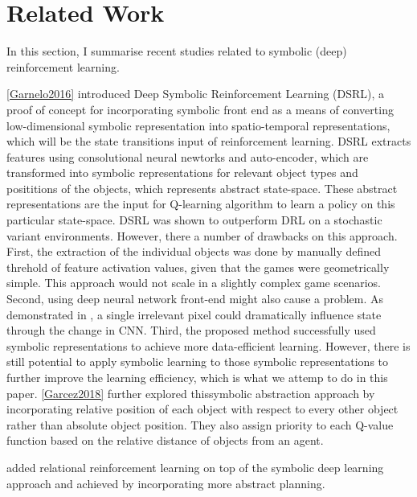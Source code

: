 \documentclass[12pt,twoside]{report}
\begin{document}
\chapter{Related Work}
\label{related_work}
In this section, I summarise recent studies related to symbolic (deep) reinforcement learning. 

 \ref{Garnelo2016} introduced Deep Symbolic Reinforcement Learning (DSRL), a proof of concept for incorporating symbolic front end as a means of converting low-dimensional symbolic representation into spatio-temporal representations, which will be the state transitions input of reinforcement learning. DSRL extracts features using consolutional neural newtorks \cite{LeCunL1998} and auto-encoder, which are transformed into symbolic representations for relevant object types and posititions of the objects, which represents abstract state-space. These abstract representations are the input for Q-learning algorithm to learn a policy on this particular state-space. DSRL was shown to outperform DRL on a stochastic variant environments. 
However, there a number of drawbacks on this approach. First, the extraction of the individual objects was done by manually defined threhold of feature activation values, given that the games were geometrically simple. This approach would not scale in a slightly complex game scenarios. Second, using deep neural network front-end might also cause a problem. As demonstrated in \cite{Su2017}, a single irrelevant pixel could dramatically influence state through the change in CNN.
Third, the proposed method successfully used symbolic representations to achieve more data-efficient learning. However, there is still potential to apply symbolic learning to those symbolic representations to further improve the learning efficiency, which is what we attemp to do in this paper. 
\ref{Garcez2018} further explored thissymbolic abstraction approach by incorporating relative position of each object with respect to every other object rather than absolute object position. They also assign priority to each Q-value function based on the relative distance of objects from an agent.




\cite{Zambaldi2018} added relational reinforcement learning on top of the symbolic deep learning approach and achieved by incorporating more abstract planning. 
\end{document}
